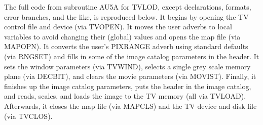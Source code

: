 The full code from subroutine AU5A for TVLOD, except declarations,
formats, error branches, and the like, is reproduced below.  It begins
by opening the TV control file and device (via TVOPEN). It moves the
user adverbs to local variables to avoid changing their (global)
values and opens the map file (via MAPOPN).  It converts the user's
PIXRANGE adverb using standard defaults (via RNGSET) and fills in some
of the image catalog parameters in the header.  It sets the window
parameters (via TVWIND), selects a single grey scale memory plane (via
DECBIT), and clears the movie parameters (via MOVIST).  Finally, it
finishes up the image catalog parameters, puts the header in the image
catalog, and reads, scales, and loads the image to the TV memory (all
via TVLOAD).  Afterwards, it closes the map file (via MAPCLS) and the
TV device and disk file (via TVCLOS).
